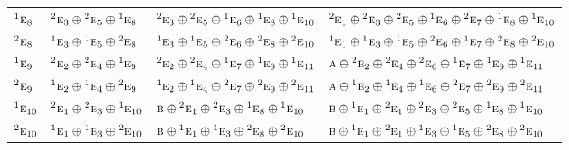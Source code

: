 \documentclass[10pt,a4paper]{article}
\numberwithin{equation}{section}
\newcommand{\irr}[1]{\text{\normalfont\scshape #1}}
\newcommand{\conjpair}[1]{{}^{#1}}
\begin{document}
{\begin{longtable}{@{}llll@{}}
$\conjpair{1}\irr{e}_{8}$ & $\conjpair{2}\irr{e}_{3}\oplus \conjpair{2}\irr{e}_{5}\oplus \conjpair{1}\irr{e}_{8}$ & $\conjpair{2}\irr{e}_{3}\oplus \conjpair{2}\irr{e}_{5}\oplus \conjpair{1}\irr{e}_{6}\oplus \conjpair{1}\irr{e}_{8}\oplus \conjpair{1}\irr{e}_{10}$ & $\conjpair{2}\irr{e}_{1}\oplus \conjpair{2}\irr{e}_{3}\oplus \conjpair{2}\irr{e}_{5}\oplus \conjpair{1}\irr{e}_{6}\oplus \conjpair{2}\irr{e}_{7}\oplus \conjpair{1}\irr{e}_{8}\oplus \conjpair{1}\irr{e}_{10}$\\
$\conjpair{2}\irr{e}_{8}$ & $\conjpair{1}\irr{e}_{3}\oplus \conjpair{1}\irr{e}_{5}\oplus \conjpair{2}\irr{e}_{8}$ & $\conjpair{1}\irr{e}_{3}\oplus \conjpair{1}\irr{e}_{5}\oplus \conjpair{2}\irr{e}_{6}\oplus \conjpair{2}\irr{e}_{8}\oplus \conjpair{2}\irr{e}_{10}$ & $\conjpair{1}\irr{e}_{1}\oplus \conjpair{1}\irr{e}_{3}\oplus \conjpair{1}\irr{e}_{5}\oplus \conjpair{2}\irr{e}_{6}\oplus \conjpair{1}\irr{e}_{7}\oplus \conjpair{2}\irr{e}_{8}\oplus \conjpair{2}\irr{e}_{10}$\\
$\conjpair{1}\irr{e}_{9}$ & $\conjpair{2}\irr{e}_{2}\oplus \conjpair{2}\irr{e}_{4}\oplus \conjpair{1}\irr{e}_{9}$ & $\conjpair{2}\irr{e}_{2}\oplus \conjpair{2}\irr{e}_{4}\oplus \conjpair{1}\irr{e}_{7}\oplus \conjpair{1}\irr{e}_{9}\oplus \conjpair{1}\irr{e}_{11}$ & $\irr{a}\oplus \conjpair{2}\irr{e}_{2}\oplus \conjpair{2}\irr{e}_{4}\oplus \conjpair{2}\irr{e}_{6}\oplus \conjpair{1}\irr{e}_{7}\oplus \conjpair{1}\irr{e}_{9}\oplus \conjpair{1}\irr{e}_{11}$\\
$\conjpair{2}\irr{e}_{9}$ & $\conjpair{1}\irr{e}_{2}\oplus \conjpair{1}\irr{e}_{4}\oplus \conjpair{2}\irr{e}_{9}$ & $\conjpair{1}\irr{e}_{2}\oplus \conjpair{1}\irr{e}_{4}\oplus \conjpair{2}\irr{e}_{7}\oplus \conjpair{2}\irr{e}_{9}\oplus \conjpair{2}\irr{e}_{11}$ & $\irr{a}\oplus \conjpair{1}\irr{e}_{2}\oplus \conjpair{1}\irr{e}_{4}\oplus \conjpair{1}\irr{e}_{6}\oplus \conjpair{2}\irr{e}_{7}\oplus \conjpair{2}\irr{e}_{9}\oplus \conjpair{2}\irr{e}_{11}$\\
$\conjpair{1}\irr{e}_{10}$ & $\conjpair{2}\irr{e}_{1}\oplus \conjpair{2}\irr{e}_{3}\oplus \conjpair{1}\irr{e}_{10}$ & $\irr{b}\oplus \conjpair{2}\irr{e}_{1}\oplus \conjpair{2}\irr{e}_{3}\oplus \conjpair{1}\irr{e}_{8}\oplus \conjpair{1}\irr{e}_{10}$ & $\irr{b}\oplus \conjpair{1}\irr{e}_{1}\oplus \conjpair{2}\irr{e}_{1}\oplus \conjpair{2}\irr{e}_{3}\oplus \conjpair{2}\irr{e}_{5}\oplus \conjpair{1}\irr{e}_{8}\oplus \conjpair{1}\irr{e}_{10}$\\
$\conjpair{2}\irr{e}_{10}$ & $\conjpair{1}\irr{e}_{1}\oplus \conjpair{1}\irr{e}_{3}\oplus \conjpair{2}\irr{e}_{10}$ & $\irr{b}\oplus \conjpair{1}\irr{e}_{1}\oplus \conjpair{1}\irr{e}_{3}\oplus \conjpair{2}\irr{e}_{8}\oplus \conjpair{2}\irr{e}_{10}$ & $\irr{b}\oplus \conjpair{1}\irr{e}_{1}\oplus \conjpair{2}\irr{e}_{1}\oplus \conjpair{1}\irr{e}_{3}\oplus \conjpair{1}\irr{e}_{5}\oplus \conjpair{2}\irr{e}_{8}\oplus \conjpair{2}\irr{e}_{10}$\\

\end{longtable}}
\end{document}
